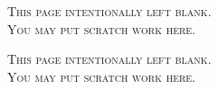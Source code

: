 
\newpage{}
\begin{center}
    \textsc{This page intentionally left blank.\\
    You may put scratch work here.}
\end{center}

\newpage{}
\begin{center}
    \textsc{This page intentionally left blank.\\
    You may put scratch work here.}
\end{center}